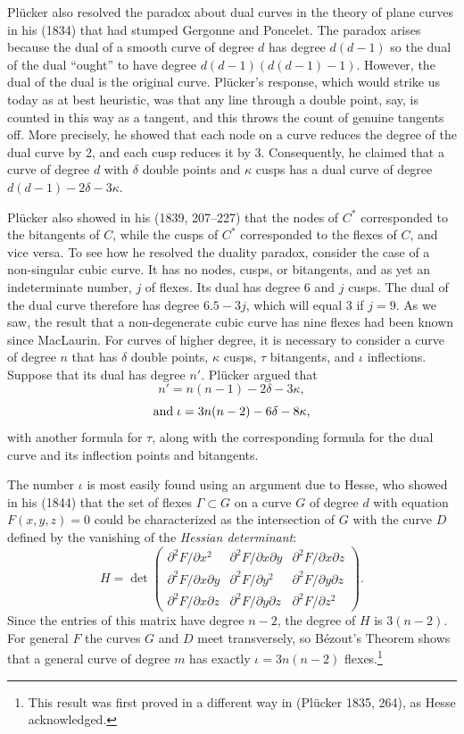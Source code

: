 Pl\"ucker also resolved the paradox about dual curves in the theory of plane curves in his (1834) that had stumped Gergonne and Poncelet. The paradox arises because the dual of a smooth curve of degree $d$ has degree $d(d-1)$
so the dual of the dual ``ought'' to have degree $d(d-1)(d(d-1)-1)$. However, the dual of the dual is the original curve.  
Pl\"ucker's response, which would strike us today as at best heuristic, was that any line through a double point, say, is counted in this way as a tangent, and this throws the count of genuine tangents off. More precisely, he  showed that each node on a curve reduces the degree of the dual curve by 2, and each cusp reduces it by 3. Consequently, he claimed that  a curve of degree $d$ with $\delta$ double points and $\kappa$ cusps has a dual curve  of degree $d(d-1) -  2\delta - 3\kappa.$ 




Pl\"ucker also showed in his (1839, 207--227) that the nodes of $C^{*}$  corresponded to the bitangents of $C$, while the cusps of $C^{*}$ corresponded to the flexes of $C$, and vice versa. To see how he resolved the duality paradox, consider  the case of a non-singular cubic curve. It has no nodes, cusps, or bitangents, and as yet an indeterminate number, $j$ of flexes. Its dual has degree 6 and $j$ cusps. The dual of the dual curve therefore has degree $6.5 - 3j$, which will equal 3 if $j = 9.$ As we saw, the result that a non-degenerate cubic curve has nine flexes had been known since MacLaurin. For curves of higher degree, it is necessary to consider a curve of degree $n$ that has $\delta$ double points, $\kappa$ cusps, $\tau$ bitangents, and $\iota$ inflections. Suppose that its dual has degree $n'$. Pl\"ucker argued that
\[n' = n(n-1) - 2\delta - 3 \kappa,\]
\[{\rm and}\; \iota = 3n(n-2) - 6\delta - 8\kappa,\]
with another formula for $\tau$, along with the corresponding formula for the dual curve and its inflection points and bitangents.

The number $\iota$ is most easily found using an argument due to Hesse, who showed  in his (1844)  that the set of flexes $\Gamma\subset G$ on a curve $G$ of degree $d$ with equation $F(x, y, z) = 0$ could be characterized as the intersection of $G$  with the curve $D$ defined by the vanishing of the \emph{Hessian determinant}:
$$
H = \det \begin{pmatrix}
 \partial^{2}F/\partial x^{2} &\partial^{2}F/\partial x\partial y &\partial^{2}F/\partial x\partial z \\
\partial^{2}F/\partial x\partial y  &\partial^{2}F/\partial y^{2} &\partial^{2}F/\partial y\partial z \\
\partial^{2}F/\partial x\partial z &\partial^{2}F/\partial y\partial z &\partial^{2}F/\partial z^{2} 
\end{pmatrix}.
$$
Since the entries of this matrix have degree $n-2$, the degree of $H$ is $3(n-2).$ For general $F$ the curves $G$ and $D$ meet transversely, so B\'ezout's Theorem shows that a general curve of degree $m$ has exactly $\iota = 3n(n-2)$ flexes.\footnote{This result was first proved in a different way in (Pl\"ucker 1835, 264), as Hesse acknowledged.}

